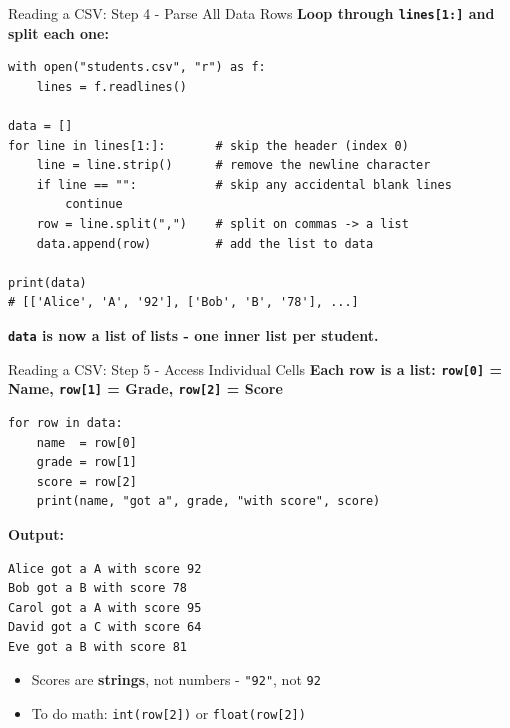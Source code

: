 \documentclass{csbeamer}
\begin{document}
\begin{frame}[fragile]{Reading a CSV: Step 4 - Parse All Data Rows}
    \textbf{Loop through \texttt{lines[1:]} and split each one:}

    \begin{lstlisting}
with open("students.csv", "r") as f:
    lines = f.readlines()

data = []
for line in lines[1:]:       # skip the header (index 0)
    line = line.strip()      # remove the newline character
    if line == "":           # skip any accidental blank lines
        continue
    row = line.split(",")    # split on commas -> a list
    data.append(row)         # add the list to data

print(data)
# [['Alice', 'A', '92'], ['Bob', 'B', '78'], ...]
    \end{lstlisting}

    \pause

    \textbf{\texttt{data} is now a \textcolor{marigold}{list of lists} - one inner list per student.}
\end{frame}

\begin{frame}[fragile]{Reading a CSV: Step 5 - Access Individual Cells}
    \textbf{Each row is a list: \texttt{row[0]} = Name, \texttt{row[1]} = Grade, \texttt{row[2]} = Score}

    \begin{lstlisting}
for row in data:
    name  = row[0]
    grade = row[1]
    score = row[2]
    print(name, "got a", grade, "with score", score)
    \end{lstlisting}

    \pause

    \textbf{Output:}

    \begin{lstlisting}
Alice got a A with score 92
Bob got a B with score 78
Carol got a A with score 95
David got a C with score 64
Eve got a B with score 81
    \end{lstlisting}

    \pause

    \begin{itemize}
        \item<3-> Scores are \textcolor{stfxblue}{\textbf{strings}}, not numbers - \texttt{"92"}, not \texttt{92}
        \item<4-> To do math: \texttt{int(row[2])} or \texttt{float(row[2])}
    \end{itemize}
\end{frame}
\end{document}
